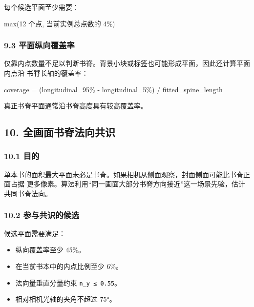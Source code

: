 \documentclass[
  chinese,
  11pt,
  a4paper,
]{article}
\newenvironment{Shaded}{\begin{snugshade}}{\end{snugshade}}
\newcommand{\NormalTok}[1]{#1}
\providecommand{\tightlist}{%
  \setlength{\itemsep}{0pt}\setlength{\parskip}{0pt}}
\begin{document}
每个候选平面至少需要：

\begin{Shaded}
\begin{Highlighting}[]
\NormalTok{max(12 个点, 当前实例总点数的 4\%)}
\end{Highlighting}
\end{Shaded}

\subsubsection{9.3
平面纵向覆盖率}\label{93-ux5e73ux9762ux7eb5ux5411ux8986ux76d6ux7387}

仅靠内点数量不足以判断书脊。背景小块或标签也可能形成平面，因此还计算平面内点沿
书脊长轴的覆盖率：

\begin{Shaded}
\begin{Highlighting}[]
\NormalTok{coverage =}
\NormalTok{  (longitudinal\_95\% {-} longitudinal\_5\%) / fitted\_spine\_length}
\end{Highlighting}
\end{Shaded}

真正书脊平面通常沿书脊高度具有较高覆盖率。

\subsection{10.
全画面书脊法向共识}\label{10-ux5168ux753bux9762ux4e66ux810aux6cd5ux5411ux5171ux8bc6}

\subsubsection{10.1 目的}\label{101-ux76eeux7684}

单本书的面积最大平面未必是书脊。如果相机从侧面观察，封面侧面可能比书脊正面占据
更多像素。算法利用``同一画面大部分书脊方向接近''这一场景先验，估计共同书脊法向。

\subsubsection{10.2
参与共识的候选}\label{102-ux53c2ux4e0eux5171ux8bc6ux7684ux5019ux9009}

候选平面需要满足：

\begin{itemize}
\tightlist
\item
  纵向覆盖率至少 45\%。
\item
  在当前书本中的内点比例至少 6\%。
\item
  法向量垂直分量约束 \texttt{\textbar{}n\_y\textbar{}\ ≤\ 0.55}。
\item
  相对相机光轴的夹角不超过 75°。
\end{itemize}
\end{document}
